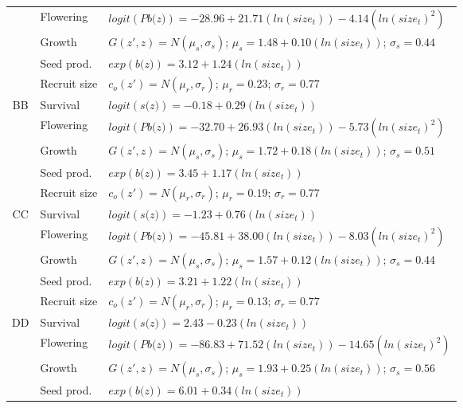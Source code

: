 \documentclass[12pt, letterpaper]{article}
\begin{document}
\begin{spacing}{1.3}
\begin{longtable}[ht!]{c|l|p{}}
         & Flowering  & $logit(\textit{Pb(z)})  = -28.96 + 21.71(ln(size_t)) -4.14(ln(size_t)^2)$ \\
         \rowcolor[gray]{.95}& Growth  &  $G(z',z) = N(\mu_s, \sigma_s)$; $\mu_s = 1.48 + 0.10(ln(size_t))$; $\sigma_s = 0.44$\\
         & Seed prod.  & $exp(\textit{b(z)}) = 3.12 + 1.24(ln(size_t))$  \\
         \rowcolor[gray]{.95}& Recruit size  &  $c_o(z') = N(\mu_r, \sigma_r)$; $\mu_r = 0.23$; $\sigma_r = 0.77$ \\
         \hline
         BB  &  Survival  &  $logit(\textit{s(z)})= -0.18 + 0.29(ln(size_t))$ \\
         \rowcolor[gray]{.95}& Flowering  & $logit(\textit{Pb(z)})  = -32.70 + 26.93(ln(size_t)) -5.73(ln(size_t)^2)$ \\
         & Growth  &  $G(z',z) = N(\mu_s, \sigma_s)$; $\mu_s = 1.72 + 0.18(ln(size_t))$; $\sigma_s = 0.51$\\
         \rowcolor[gray]{.95}& Seed prod.  & $exp(\textit{b(z)}) = 3.45 + 1.17(ln(size_t))$  \\
         & Recruit size  &  $c_o(z') = N(\mu_r, \sigma_r)$; $\mu_r = 0.19$; $\sigma_r = 0.77$ \\
         \hline
         \rowcolor[gray]{.95}CC  &  Survival  &  $logit(\textit{s(z)})= -1.23 + 0.76(ln(size_t))$ \\
         & Flowering  & $logit(\textit{Pb(z)})  = -45.81 + 38.00(ln(size_t)) -8.03(ln(size_t)^2)$ \\
         \rowcolor[gray]{.95}& Growth  &  $G(z',z) = N(\mu_s, \sigma_s)$; $\mu_s = 1.57 + 0.12(ln(size_t))$; $\sigma_s = 0.44$\\
         & Seed prod.  & $exp(\textit{b(z)}) = 3.21 + 1.22(ln(size_t))$  \\
         \rowcolor[gray]{.95}& Recruit size  &  $c_o(z') = N(\mu_r, \sigma_r)$; $\mu_r = 0.13$; $\sigma_r = 0.77$ \\
         \hline
         DD  &  Survival  &  $logit(\textit{s(z)})= 2.43-0.23(ln(size_t))$ \\
         \rowcolor[gray]{.95}& Flowering  & $logit(\textit{Pb(z)})  = -86.83 + 71.52(ln(size_t)) -14.65(ln(size_t)^2)$ \\
         & Growth  &  $G(z',z) = N(\mu_s, \sigma_s)$; $\mu_s = 1.93 + 0.25(ln(size_t))$; $\sigma_s = 0.56$\\
         \rowcolor[gray]{.95}& Seed prod.  & $exp(\textit{b(z)}) = 6.01 + 0.34(ln(size_t))$  \\

\end{longtable}
\end{spacing}
\end{document}
